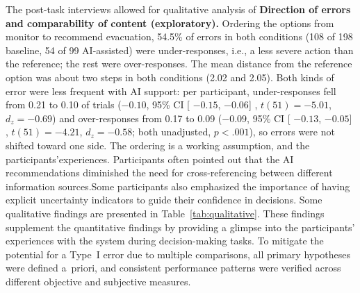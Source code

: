 \documentclass[journal]{IEEEtran}
\theoremstyle{plain}
\theoremstyle{definition}
\providecommand{\DIFaddtex}[1]{{\protect\color{blue} \sf #1}} %
\providecommand{\DIFdeltex}[1]{{\protect\color{red} \scriptsize #1}} %
\providecommand{\DIFaddbegin}{} %
\providecommand{\DIFaddend}{} %
\providecommand{\DIFdelbegin}{} %
\providecommand{\DIFdelend}{} %
\providecommand{\DIFadd}[1]{\texorpdfstring{\DIFaddtex{#1}}{#1}} %
\providecommand{\DIFdel}[1]{\texorpdfstring{\DIFdeltex{#1}}{}} %
\newcommand{\DIFscaledelfig}{0.5}
\newlength{\DIFdelgraphicswidth} %
\newlength{\DIFdelgraphicsheight} %
\newcommand{\DIFaddincludegraphics}[2][]{{\color{blue}\fbox{\DIFOincludegraphics[#1]{#2}}}} %
\newcommand{\DIFdelincludegraphics}[2][]{%
\sbox{\DIFdelgraphicsbox}{\DIFOincludegraphics[#1]{#2}}%
\settoboxwidth{\DIFdelgraphicswidth}{\DIFdelgraphicsbox} %
\settoboxtotalheight{\DIFdelgraphicsheight}{\DIFdelgraphicsbox} %
\scalebox{\DIFscaledelfig}{%
\parbox[b]{\DIFdelgraphicswidth}{\usebox{\DIFdelgraphicsbox}\\[-\baselineskip] \rule{\DIFdelgraphicswidth}{0em}}\llap{\resizebox{\DIFdelgraphicswidth}{\DIFdelgraphicsheight}{%
\setlength{\unitlength}{\DIFdelgraphicswidth}%
\begin{picture}(1,1)%
\thicklines\linethickness{2pt} %
{\color[rgb]{1,0,0}\put(0,0){\framebox(1,1){}}}%
{\color[rgb]{1,0,0}\put(0,0){\line( 1,1){1}}}%
{\color[rgb]{1,0,0}\put(0,1){\line(1,-1){1}}}%
\end{picture}%
}\hspace*{3pt}}} %
} %
\DeclareRobustCommand{\DIFaddbegin}{\DIFOaddbegin \let\includegraphics\DIFaddincludegraphics} %
\DeclareRobustCommand{\DIFaddend}{\DIFOaddend \let\includegraphics\DIFOincludegraphics} %
\DeclareRobustCommand{\DIFdelbegin}{\DIFOdelbegin \let\includegraphics\DIFdelincludegraphics} %
\DeclareRobustCommand{\DIFdelend}{\DIFOaddend \let\includegraphics\DIFOincludegraphics} %
\begin{document}
    \DIFdelbegin \DIFdel{The post-task interviews allowed for qualitative analysis of }\DIFdelend \DIFaddbegin \DIFadd{\textbf{Direction of errors and comparability of content (exploratory).} Ordering the options from monitor to recommend evacuation, 54.5\% of errors in both conditions (108 of 198 baseline, 54 of 99 AI-assisted) were under-responses, i.e., a less severe action than the reference; the rest were over-responses. The mean distance from the reference option was about two steps in both conditions (2.02 and 2.05). Both kinds of error were less frequent with AI support: per participant, under-responses fell from 0.21 to 0.10 of trials ($-0.10$, 95\% CI }[\DIFadd{$-0.15$, $-0.06$}]\DIFadd{, $t(51)=-5.01$, $d_z=-0.69$) and over-responses from 0.17 to 0.09 ($-0.09$, 95\% CI }[\DIFadd{$-0.13$, $-0.05$}]\DIFadd{, $t(51)=-4.21$, $d_z=-0.58$; both unadjusted, $p<.001$), so errors were not shifted toward one side. The ordering is a working assumption, and }\DIFaddend the \DIFdelbegin \DIFdel{participants'experiences. Participants often pointed out that the AI recommendations diminished the need for cross-referencing between different information sources.Some participants also emphasized the importance of having explicit uncertainty indicators to guide their confidence in decisions.
Some qualitative findings are presented in Table~\ref{tab:qualitative}. These findings supplement the quantitative findings by providing a glimpse into the participants' experiences with the system during decision-making tasks. To mitigate the potential for a Type~I error due to multiple comparisons, all primary hypotheses were defined a~priori, and consistent performance patterns were verified across different objective and subjective measures.
}%

\end{document}
